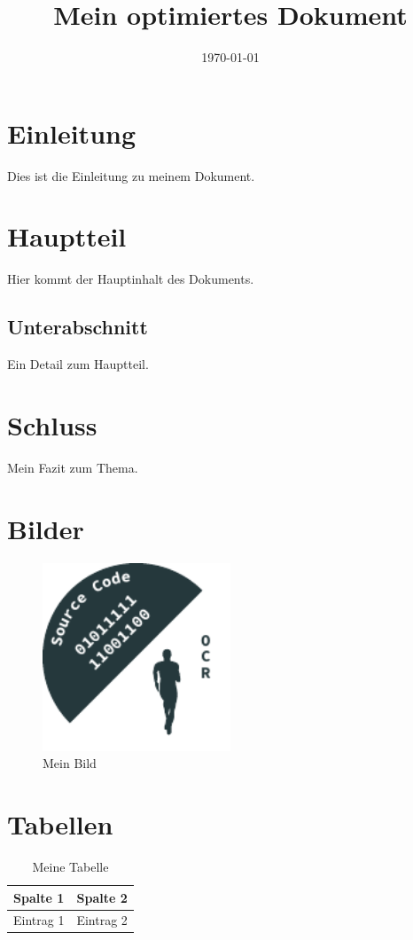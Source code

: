 \documentclass[12pt,a4paper]{scrartcl}
\title{Mein optimiertes Dokument}
\date{\today}
\begin{document}
\maketitle

\section{Einleitung}
Dies ist die Einleitung zu meinem Dokument.

\section{Hauptteil}
Hier kommt der Hauptinhalt des Dokuments.

\subsection{Unterabschnitt}
Ein Detail zum Hauptteil.

\section{Schluss}
Mein Fazit zum Thema.


\section{Bilder}
\begin{figure}[h]
  \centering
  \includegraphics[width=0.5\textwidth]{images/Logo1.pdf}
  \caption{Mein Bild}
\end{figure}

\section{Tabellen}
\begin{table}[h]
  \centering
  \begin{tabular}{c|c}
    Spalte 1 & Spalte 2 \\
    \hline
    Eintrag 1 & Eintrag 2 \\
  \end{tabular}
  \caption{Meine Tabelle}
\end{table}
\end{document}

